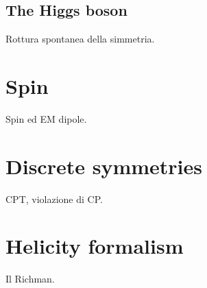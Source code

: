 \subsection{The Higgs boson}
Rottura spontanea della simmetria.

\section{Spin}
Spin ed EM dipole.

\section{Discrete symmetries}
CPT, violazione di CP.

\section{Helicity formalism}
Il Richman.